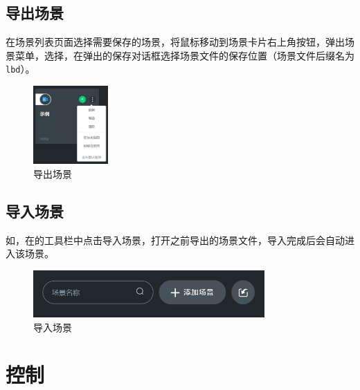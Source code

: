 

\subsection{导出场景}
\label{sec:导出场景}
在场景列表页面选择需要保存的场景，将鼠标移动到场景卡片右上角按钮，弹出场景菜单，选择，在弹出的保存对话框选择场景文件的保存位置（场景文件后缀名为 \verb|lbd|）。

\begin{figure}[htb!]
	\centering
	\includegraphics[height=3cm]{image/07/图3.20 导出场景.png}
	\caption{导出场景}
	\label{fig:导出场景}
\end{figure}

\subsection{导入场景}
\label{sec:导入场景}
如，在的工具栏中点击导入场景，打开之前导出的场景文件，导入完成后会自动进入该场景。

\begin{figure}[htb!]
	\centering
	\includegraphics[height=1.8cm]{image/07/图3.21 导入场景.png}
	\caption{导入场景}
	\label{fig:导入场景}
\end{figure}


\section{控制}

